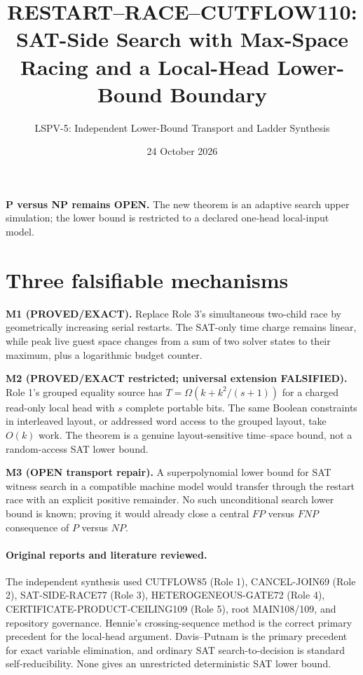 \documentclass[11pt]{article}
\title{RESTART--RACE--CUTFLOW110:\\SAT-Side Search with Max-Space Racing and a Local-Head Lower-Bound Boundary}
\author{LSPV-5: Independent Lower-Bound Transport and Ladder Synthesis}
\date{24 October 2026}
\begin{document}
\maketitle
\begin{center}
\textbf{P versus NP remains OPEN.}
The new theorem is an adaptive search upper simulation; the lower bound is
restricted to a declared one-head local-input model.
\end{center}

\section{Three falsifiable mechanisms}
\noindent\textbf{M1 (PROVED/EXACT).}
Replace Role 3's simultaneous two-child race by geometrically increasing
serial restarts.  The SAT-only time charge remains linear, while peak live
guest space changes from a sum of two solver states to their maximum, plus a
logarithmic budget counter.

\par\noindent\textbf{M2 (PROVED/EXACT restricted; universal extension
FALSIFIED).}
Role 1's grouped equality source has
$T=\Omega(k+k^2/(s+1))$ for a charged read-only local head with $s$ complete
portable bits.  The same Boolean constraints in interleaved layout, or
addressed word access to the grouped layout, take $O(k)$ work.  The theorem is
a genuine layout-sensitive time--space bound, not a random-access SAT lower
bound.

\par\noindent\textbf{M3 (OPEN transport repair).}
A superpolynomial lower bound for SAT witness search in a compatible machine
model would transfer through the restart race with an explicit positive
remainder.  No such unconditional search lower bound is known; proving it
would already close a central $FP$ versus $FNP$ consequence of $P$ versus
$NP$.

\paragraph{Original reports and literature reviewed.}
The independent synthesis used CUTFLOW85 (Role 1), CANCEL-JOIN69 (Role 2),
SAT-SIDE-RACE77 (Role 3), HETEROGENEOUS-GATE72 (Role 4),
CERTIFICATE-PRODUCT-CEILING109 (Role 5), root MAIN108/109, and repository
governance.  Hennie's crossing-sequence method is the correct primary
precedent for the local-head argument.  Davis--Putnam is the primary
precedent for exact variable elimination, and ordinary SAT
search-to-decision is standard self-reducibility.  None gives an unrestricted
deterministic SAT lower bound.
\end{document}
